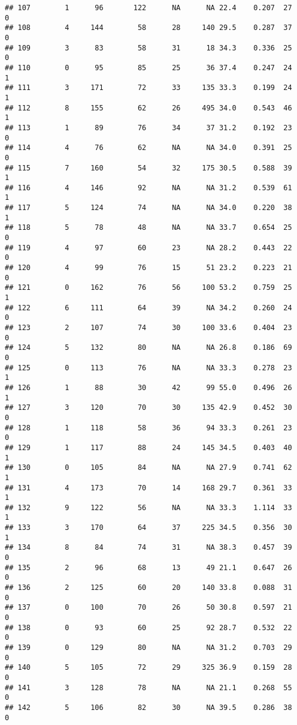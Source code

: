 \documentclass[
]{article}
\begin{document}
\begin{verbatim}
## 107        1      96       122      NA      NA 22.4    0.207  27    0
## 108        4     144        58      28     140 29.5    0.287  37    0
## 109        3      83        58      31      18 34.3    0.336  25    0
## 110        0      95        85      25      36 37.4    0.247  24    1
## 111        3     171        72      33     135 33.3    0.199  24    1
## 112        8     155        62      26     495 34.0    0.543  46    1
## 113        1      89        76      34      37 31.2    0.192  23    0
## 114        4      76        62      NA      NA 34.0    0.391  25    0
## 115        7     160        54      32     175 30.5    0.588  39    1
## 116        4     146        92      NA      NA 31.2    0.539  61    1
## 117        5     124        74      NA      NA 34.0    0.220  38    1
## 118        5      78        48      NA      NA 33.7    0.654  25    0
## 119        4      97        60      23      NA 28.2    0.443  22    0
## 120        4      99        76      15      51 23.2    0.223  21    0
## 121        0     162        76      56     100 53.2    0.759  25    1
## 122        6     111        64      39      NA 34.2    0.260  24    0
## 123        2     107        74      30     100 33.6    0.404  23    0
## 124        5     132        80      NA      NA 26.8    0.186  69    0
## 125        0     113        76      NA      NA 33.3    0.278  23    1
## 126        1      88        30      42      99 55.0    0.496  26    1
## 127        3     120        70      30     135 42.9    0.452  30    0
## 128        1     118        58      36      94 33.3    0.261  23    0
## 129        1     117        88      24     145 34.5    0.403  40    1
## 130        0     105        84      NA      NA 27.9    0.741  62    1
## 131        4     173        70      14     168 29.7    0.361  33    1
## 132        9     122        56      NA      NA 33.3    1.114  33    1
## 133        3     170        64      37     225 34.5    0.356  30    1
## 134        8      84        74      31      NA 38.3    0.457  39    0
## 135        2      96        68      13      49 21.1    0.647  26    0
## 136        2     125        60      20     140 33.8    0.088  31    0
## 137        0     100        70      26      50 30.8    0.597  21    0
## 138        0      93        60      25      92 28.7    0.532  22    0
## 139        0     129        80      NA      NA 31.2    0.703  29    0
## 140        5     105        72      29     325 36.9    0.159  28    0
## 141        3     128        78      NA      NA 21.1    0.268  55    0
## 142        5     106        82      30      NA 39.5    0.286  38    0

\end{verbatim}
\end{document}

